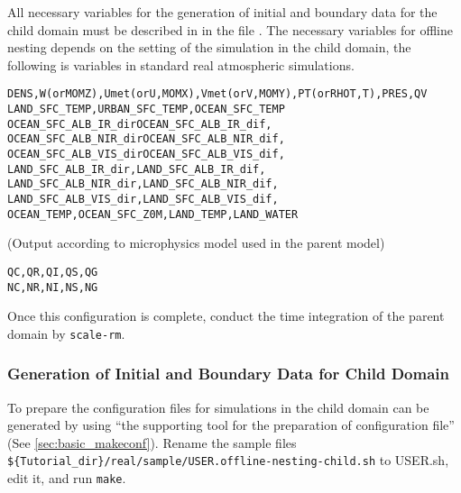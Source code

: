 All necessary variables for the generation of initial and boundary data for the child domain must be described in  in the file \runconf.
The necessary variables for offline nesting depends on the setting of the simulation in the child domain, the following is variables in standard real atmospheric simulations.
\begin{alltt}
  DENS, W (or MOMZ), Umet (or U, MOMX), Vmet (or V, MOMY), PT (or RHOT, T), PRES, QV
  LAND_SFC_TEMP, URBAN_SFC_TEMP, OCEAN_SFC_TEMP
  OCEAN_SFC_ALB_IR_dir OCEAN_SFC_ALB_IR_dif,
  OCEAN_SFC_ALB_NIR_dir OCEAN_SFC_ALB_NIR_dif,
  OCEAN_SFC_ALB_VIS_dir OCEAN_SFC_ALB_VIS_dif,
  LAND_SFC_ALB_IR_dir, LAND_SFC_ALB_IR_dif,
  LAND_SFC_ALB_NIR_dir, LAND_SFC_ALB_NIR_dif,
  LAND_SFC_ALB_VIS_dir, LAND_SFC_ALB_VIS_dif,
  OCEAN_TEMP, OCEAN_SFC_Z0M, LAND_TEMP, LAND_WATER
\end{alltt}
(Output according to microphysics model used in the parent model)
\begin{alltt}
  QC, QR, QI, QS, QG
  NC, NR, NI, NS, NG
\end{alltt}
Once this configuration is complete, conduct the time integration of the parent domain by \verb|scale-rm|.


\subsubsection{Generation of Initial and Boundary Data for Child Domain}


To prepare the configuration files for simulations in the child domain can be generated by using ``the supporting tool for the preparation of configuration file'' (See \ref{sec:basic_makeconf}).
Rename the sample files \\ \verb|${Tutorial_dir}/real/sample/USER.offline-nesting-child.sh| to USER.sh, edit it, and run \verb|make|.

